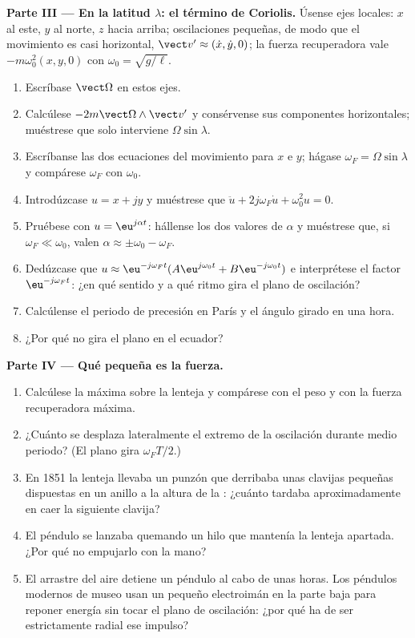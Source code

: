 \begin{problem}
\medskip
\noindent\textbf{Parte III --- En la latitud $\lambda$: el término de Coriolis.}
Úsense ejes locales: $x$ al este, $y$ al norte, $z$ hacia arriba;
oscilaciones pequeñas, de modo que el movimiento es casi horizontal,
$\vect v' \approx (\dot x, \dot y, 0)$; la fuerza recuperadora vale
$-m\omega_0^2(x, y, 0)$ con $\omega_0 = \sqrt{g/\ell}$.
\begin{enumerate}[resume]
  \item Escríbase $\vect\Omega$ en estos ejes.
  \item Calcúlese $-2m\vect\Omega\wedge\vect v'$ y consérvense sus
        componentes horizontales; muéstrese que solo interviene
        $\Omega\sin\lambda$.
  \item Escríbanse las dos ecuaciones del movimiento para $x$ e $y$;
        hágase $\omega_F = \Omega\sin\lambda$ y compárese $\omega_F$ con $\omega_0$.
  \item Introdúzcase $u = x + jy$ y muéstrese que $\ddot u + 2j\omega_F\dot u +
        \omega_0^2u = 0$.
  \item Pruébese con $u = \eu^{j\alpha t}$: hállense los dos valores de
        $\alpha$ y muéstrese que, si $\omega_F \ll \omega_0$, valen $\alpha \approx \pm\omega_0
        - \omega_F$.
  \item Dedúzcase que $u \approx \eu^{-j\omega_Ft}(A\eu^{j\omega_0t} + B\eu^{-j\omega_0t})$
        e interprétese el factor $\eu^{-j\omega_Ft}$: ¿en qué sentido y a qué
        ritmo gira el plano de oscilación?
  \item Calcúlense el periodo de precesión en París y el ángulo girado en
        una hora.
  \item ¿Por qué no gira el plano en el ecuador?
\end{enumerate}

\medskip
\noindent\textbf{Parte IV --- Qué pequeña es la fuerza.}
\begin{enumerate}[resume]
  \item Calcúlese la  máxima sobre la lenteja y
        compárese con el peso y con la fuerza recuperadora máxima.
  \item ¿Cuánto se desplaza lateralmente el extremo de la oscilación
        durante medio periodo? (El plano gira $\omega_FT/2$.)
  \item En 1851 la lenteja llevaba un punzón que derribaba unas clavijas
        pequeñas dispuestas en un anillo a la altura de la :
        ¿cuánto tardaba aproximadamente en caer la siguiente clavija?
  \item El péndulo se lanzaba quemando un hilo que mantenía la lenteja
        apartada. ¿Por qué no empujarlo con la mano?
  \item El arrastre del aire detiene un péndulo al cabo de unas horas. Los
        péndulos modernos de museo usan un pequeño electroimán en la parte
        baja para reponer energía sin tocar el plano de oscilación: ¿por
        qué ha de ser estrictamente radial ese impulso?
\end{enumerate}


\end{problem}
